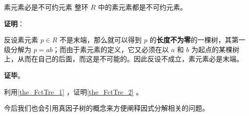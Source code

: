 \begin{theorem}{素元素必是不可约元素}\label{the_FctTre_2}
整环 $R$ 中的素元素都是不可约元素。
\end{theorem}

\textbf{证明}：

反设素元素 $p\in R$ 不是末端，那么就可以得到 $p$ 的\textbf{长度不为零}的一棵树，其第一级分解为 $p=ab$；而由于素元素的定义，它又必须在以 $a$ 和 $b$ 为起点的某棵树上，从而在自己的后面，而这是不可能的。因此反设不成立，素元素必是末端。

\textbf{证毕}。

\begin{exercise}{}\label{exe_FctTre_1}
利用\autoref{the_FctTre_1} ，证明\autoref{the_FctTre_2} 。
\end{exercise}

今后我们也会引用真因子树的概念来方便阐释因式分解相关的问题。

